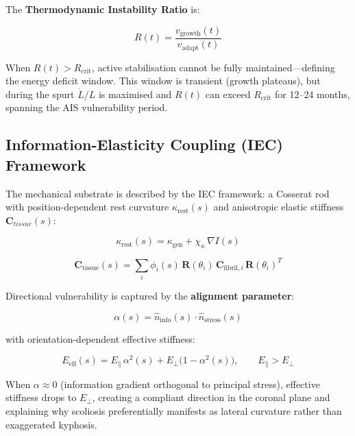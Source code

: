 \documentclass[12pt, letterpaper]{article}
\newcommand{\Rt}{R(t)}
\begin{document}
The \textbf{Thermodynamic Instability Ratio} is:

\begin{equation}
  \Rt = \frac{v_{\mathrm{growth}}(t)}{v_{\mathrm{adapt}}(t)}
  \label{eq:ratio}
\end{equation}

When $R(t) > R_{\mathrm{crit}}$, active stabilisation cannot be fully
maintained---defining the energy deficit window. This window is transient
(growth plateaus), but during the spurt $\dot{L}/L$ is maximised and $R(t)$
can exceed $R_{\mathrm{crit}}$ for 12--24 months, spanning the AIS
vulnerability period.

\subsection{Information-Elasticity Coupling (IEC) Framework}

The mechanical substrate is described by the IEC framework: a Cosserat rod
with position-dependent rest curvature $\kappa_{\mathrm{rest}}(s)$ and
anisotropic elastic stiffness $\mathbf{C}_{tissue}(s)$:

\begin{equation}
  \kappa_{\mathrm{rest}}(s) = \kappa_{\mathrm{gen}} + \chi_\kappa\,\nabla I(s)
  \label{eq:restcurv}
\end{equation}

\begin{equation}
  \mathbf{C}_{\mathrm{tissue}}(s)
    = \sum_i \phi_i(s)\,\mathbf{R}(\theta_i)\,\mathbf{C}_{\mathrm{fibril},i}\,
      \mathbf{R}(\theta_i)^{T}
  \label{eq:homog}
\end{equation}

Directional vulnerability is captured by the \textbf{alignment parameter}:

\begin{equation}
  \alpha(s) = \hat{n}_{\mathrm{info}}(s)\cdot\hat{n}_{\mathrm{stress}}(s)
  \label{eq:alpha}
\end{equation}

with orientation-dependent effective stiffness:

\begin{equation}
  E_{\mathrm{eff}}(s) = E_\parallel\,\alpha^{2}(s)
    + E_\perp\!\bigl(1-\alpha^{2}(s)\bigr),
  \qquad E_\parallel > E_\perp
  \label{eq:Eeff}
\end{equation}

When $\alpha\approx 0$ (information gradient orthogonal to principal stress),
effective stiffness drops to $E_\perp$, creating a compliant direction in the
coronal plane and explaining why scoliosis preferentially manifests as lateral
curvature rather than exaggerated kyphosis.
\end{document}
